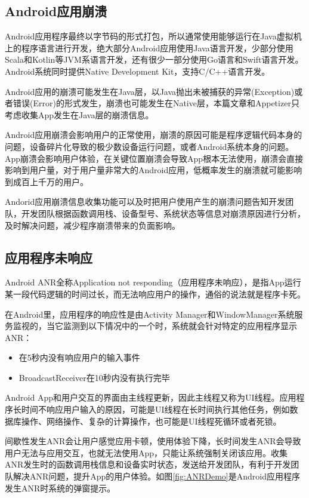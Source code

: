 \subsection{Android应用崩溃}

Android应用程序最终以字节码的形式打包，所以通常使用能够运行在Java虚拟机上的程序语言进行开发，绝大部分Android应用使用Java语言开发，少部分使用Scala和Kotlin等JVM系语言开发，还有很少一部分使用Go语言和Swift语言开发。Android系统同时提供Native Development Kit，支持C/C++语言开发。

Android应用的崩溃可能发生在Java层，以Java抛出未被捕获的异常(Exception)或者错误(Error)的形式发生，崩溃也可能发生在Native层，本篇文章和Appetizer只考虑收集App发生在Java层的崩溃信息。

Android应用崩溃会影响用户的正常使用，崩溃的原因可能是程序逻辑代码本身的问题，设备碎片化导致的极少数设备运行问题，或者Android系统本身的问题。App崩溃会影响用户体验，在关键位置崩溃会导致App根本无法使用，崩溃会直接影响到用户量，对于用户量非常大的Android应用，低概率发生的崩溃就可能影响到成百上千万的用户。

Andorid应用崩溃信息收集功能可以及时把用户使用产生的崩溃问题告知开发团队，开发团队根据函数调用栈、设备型号、系统状态等信息对崩溃原因进行分析，及时解决问题，减少程序崩溃带来的负面影响。

\subsection{应用程序未响应}
\label{subsec:background_ANR}

Android ANR全称Application not responding（应用程序未响应），是指App运行某一段代码逻辑的时间过长，而无法响应用户的操作，通俗的说法就是程序卡死。

在Android里，应用程序的响应性是由Activity Manager和WindowManager系统服务监视的，当它监测到以下情况中的一个时，系统就会针对特定的应用程序显示ANR\parencite{ANR_define}：

 \begin{itemize}
 	\item 在5秒内没有响应用户的输入事件
 	\item BroadcastReceiver在10秒内没有执行完毕
 \end{itemize}

Android App和用户交互的界面由主线程更新，因此主线程又称为UI线程。应用程序长时间不响应用户输入的原因，可能是UI线程在长时间执行其他任务，例如数据库操作、网络操作、复杂的计算操作，也可能是UI线程死循环或者死锁。

间歇性发生ANR会让用户感觉应用卡顿，使用体验下降，长时间发生ANR会导致用户无法与应用交互，也就无法使用App，只能让系统强制关闭该应用。收集ANR发生时的函数调用栈信息和设备实时状态，发送给开发团队，有利于开发团队解决ANR问题，提升App的用户体验。如图\ref{fig:ANRDemo}是Android应用程序发生ANR时系统的弹窗提示。

